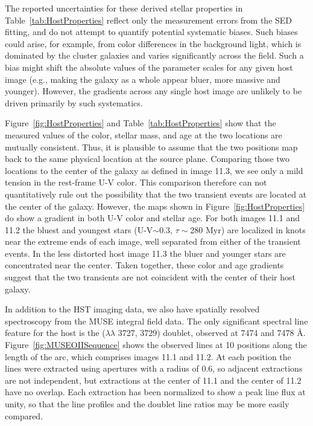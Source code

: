 The reported uncertainties for these derived stellar properties in
Table~\ref{tab:HostProperties} reflect only the measurement errors
from the SED fitting, and do not attempt to quantify potential
systematic biases.  Such biases could arise, for example, from color
differences in the background light, which is dominated by the cluster
galaxies and varies significantly across the  field.  Such a
bias might shift the absolute values of the parameter scales for any
given host image (e.g., making the galaxy as a whole appear bluer,
more massive and younger). However, the gradients across any single
host image are unlikely to be driven primarily by such systematics.

Figure~\ref{fig:HostProperties} and Table~\ref{tab:HostProperties}
show that the measured values of the color, stellar mass, and age at
the two \spock locations are mutually consistent. Thus, it is
plausible to assume that the two positions map back to the same
physical location at the source plane.  Comparing those two locations
to the center of the galaxy as defined in image 11.3, we see only a
mild tension in the rest-frame U-V color. This comparison therefore
can not quantitatively rule out the possibility that the two transient
events are located at the center of the galaxy. However, the maps
shown in Figure~\ref{fig:HostProperties} do show a gradient in both
U-V color and stellar age. For both images 11.1 and 11.2 the bluest
and youngest stars (U-V$\sim$0.3, $\tau\sim$280 Myr) are localized in
knots near the extreme ends of each image, well separated from either
of the \spock transient events.  In the less distorted host image 11.3
the bluer and younger stars are concentrated near the center. Taken
together, these color and age gradients suggest that the two
transients are not coincident with the center of their host galaxy.

In addition to the HST imaging data, we also have spatially resolved
spectroscopy from the MUSE integral field data. The only significant
spectral line feature for the \spock host is the 
($\lambda\lambda$ 3727, 3729) doublet, observed at 7474 and 7478
\AA. Figure~\ref{fig:MUSEOIISequence} shows the observed
 lines at 10 positions along the length of the arc,
which comprises images 11.1 and 11.2.  At each position the lines were
extracted using apertures with a radius of 0.6\arcsec, so adjacent
extractions are not independent, but extractions at the center of
11.1 and the center of 11.2 have no overlap. Each extraction has been
normalized to show a peak line flux at unity, so that the line
profiles and the doublet line ratios may be more easily
compared. 


